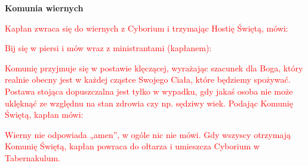 \begin{center}
\textbf{Komunia wiernych}
\end{center}

\begin{center}
\textcolor{red}{Kapłan zwraca się do wiernych z Cyborium i trzymając Hostię Świętą, mówi:}
\end{center}

\begin{Parallel}[v]{0.485\textwidth}{0.485\textwidth}

\end{Parallel}

\begin{center}
\textcolor{red}{Bij się w piersi i mów wraz z ministrantami (kapłanem):}
\end{center}

\begin{Parallel}[v]{0.485\textwidth}{0.485\textwidth}

\end{Parallel}

\begin{center}
\textcolor{red}{Komunię przyjmuje się w postawie klęczącej, wyrażając szacunek dla Boga, który realnie obecny jest w każdej cząstce Swojego Ciała, które będziemy spożywać. Postawa stojąca dopuszczalna jest tylko w wypadku, gdy jakaś osoba nie może uklęknąć ze względnu na stan zdrowia czy np. sędziwy wiek. Podając Komunię Świętą, kapłan mówi:}
\end{center}

\begin{Parallel}[v]{0.485\textwidth}{0.485\textwidth}

\end{Parallel}

\begin{center}
\textcolor{red}{Wierny nie odpowiada „amen”, w ogóle nic nie mówi. Gdy wszyscy otrzymają Komunię Świętą, kapłan powraca do ołtarza i umieszcza Cyborium w Tabernakulum.}
\end{center}

